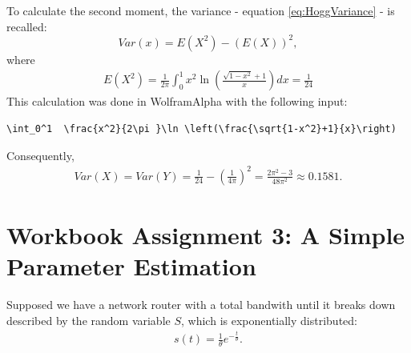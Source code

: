 To calculate the second moment, the variance - equation \eqref{eq:HoggVariance} - is recalled:
\[
Var(x) = E(X^2)-(E(X))^2,
\]
where
\begin{equation}
\begin{split}
E(X^2) =  \frac{1}{2\pi}\int_0^1  x^2\ln \left(\frac{\sqrt{1-x^2}+1}{x}\right) dx = \frac{1}{24}
\end{split}
\label{eq:E(X^2)}
\end{equation}
This calculation was done in WolframAlpha \cite{wolfalph} with the following input:
\begin{lstlisting}
\int_0^1  \frac{x^2}{2\pi }\ln \left(\frac{\sqrt{1-x^2}+1}{x}\right)
\end{lstlisting}
Consequently, 
\begin{equation}
\begin{split}
Var(X) = Var(Y) = \frac{1}{24}- \left(\frac{1}{4\pi}\right)^2 = \frac{2\pi ^2-3}{48\pi ^2} \approx 0.1581.
\end{split}
\label{eq:VarXcalculated}
\end{equation}



\chapter{Workbook Assignment 3: A Simple Parameter Estimation}	

Supposed we have a network router with a total bandwith until it breaks down described by the random variable $S$, which is exponentially distributed:
\begin{equation}
\begin{split}
s(t) =  \frac{1}{\theta} e^{-\frac{t}{\theta}}.
\end{split}
\label{eq:exphardwarefailure}
\end{equation}


